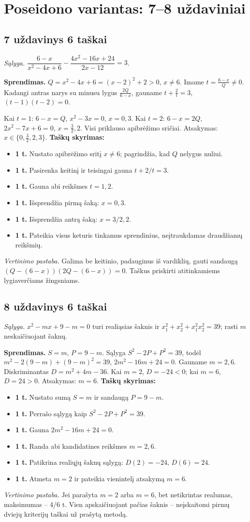 \documentclass[11pt,a4paper]{article}
\newcommand{\uzd}[3]{\subsection*{#1 uždavinys \hfill #2 taškai}\textit{Sąlyga.} #3\par}
\newcommand{\kriterijai}{\textbf{Taškų skyrimas:}}
\newcommand{\balas}[2]{\item \textbf{#1 t.} #2}
\begin{document}
\section*{Poseidono variantas: 7--8 uždaviniai}
\uzd{7}{6}{$\dfrac{6-x}{x^2-4x+6}-\dfrac{4x^2-16x+24}{2x-12}=3$.}
\textbf{Sprendimas.} $Q=x^2-4x+6=(x-2)^2+2>0$, $x\ne6$. Imame $t=\frac{6-x}{Q}\ne0$. Kadangi antras narys su minusu lygus $\frac{2Q}{6-x}$, gauname $t+\frac2t=3$, $(t-1)(t-2)=0$.\par Kai $t=1$: $6-x=Q$, $x^2-3x=0$, $x=0,3$. Kai $t=2$: $6-x=2Q$, $2x^2-7x+6=0$, $x=\frac32,2$. Visi priklauso apibrėžimo sričiai. Atsakymas: $x\in\{0,\frac32,2,3\}$.
\kriterijai\begin{itemize}
\balas{1}{Nustato apibrėžimo sritį $x\ne6$; pagrindžia, kad $Q$ nelygus nuliui.}
\balas{1}{Pasirenka keitinį ir teisingai gauna $t+2/t=3$.}
\balas{1}{Gauna abi reikšmes $t=1,2$.}
\balas{1}{Išsprendžia pirmą šaką: $x=0,3$.}
\balas{1}{Išsprendžia antrą šaką: $x=3/2,2$.}
\balas{1}{Pateikia visus keturis tinkamus sprendinius, neįtraukdamas draudžiamų reikšmių.}
\end{itemize}
\textit{Vertinimo pastaba.} Galima be keitinio, padauginus iš vardiklių, gauti sandaugą $(Q-(6-x))(2Q-(6-x))=0$. Taškus priskirti atitinkamiems lygiaverčiams žingsniams.
\uzd{8}{6}{$x^2-mx+9-m=0$ turi realiąsias šaknis ir $x_1^2+x_2^2+x_1^2x_2^2=39$; rasti $m$ neskaičiuojant šaknų.}
\textbf{Sprendimas.} $S=m$, $P=9-m$. Sąlyga $S^2-2P+P^2=39$, todėl $m^2-2(9-m)+(9-m)^2=39$, $2m^2-16m+24=0$. Gauname $m=2,6$. Diskriminantas $D=m^2+4m-36$. Kai $m=2$, $D=-24<0$; kai $m=6$, $D=24>0$. Atsakymas: $m=6$.
\kriterijai\begin{itemize}
\balas{1}{Nustato sumą $S=m$ ir sandaugą $P=9-m$.}
\balas{1}{Perrašo sąlygą kaip $S^2-2P+P^2=39$.}
\balas{1}{Gauna $2m^2-16m+24=0$.}
\balas{1}{Randa abi kandidatines reikšmes $m=2,6$.}
\balas{1}{Patikrina realiųjų šaknų sąlygą: $D(2)=-24$, $D(6)=24$.}
\balas{1}{Atmeta $m=2$ ir pateikia vienintelį atsakymą $m=6$.}
\end{itemize}
\textit{Vertinimo pastaba.} Jei parašyta $m=2$ arba $m=6$, bet netikrintas realumas, maksimumas -- 4/6 t. Vien apskaičiuojant pačias šaknis -- neįskaitomi pirmų dviejų kriterijų taškai už prašytą metodą.
\end{document}
